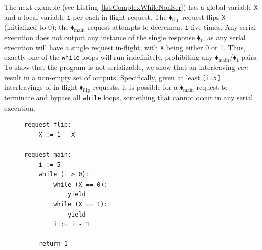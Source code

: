 The next example (see Listing~\ref{lst:ComplexWhileNonSer}) has a global variable \texttt{X} and a local variable \texttt{i} per each in-flight request. The {\color{ForestGreen}$\blacklozenge_\text{flip}$} request flips \texttt{X} (initialized to 0); the {\color{ForestGreen}$\blacklozenge_\text{main}$} request attempts to decrement \texttt{i} five times.
%
%
Any serial execution does not output any instance of the single response {\color{red}$\blacklozenge_1$}, 
as any serial execution will have a single request in-flight, with \texttt{X} being either 0 or 1. Thus, exactly one of the \texttt{while} loops will run indefinitely, prohibiting any {\color{ForestGreen}$\blacklozenge_\text{main}$}/{\color{red}$\blacklozenge_1$} pairs.
%
%
To show that the program is not serializable, we show that an interleaving \emph{can} result in a non-empty set of outputs. 
%
%
Specifically, given at least \texttt{[i=5]} interleavings of in-flight {\color{ForestGreen}$\blacklozenge_\text{flip}$} requests, it is possible for a {\color{ForestGreen}$\blacklozenge_\text{main}$} request to terminate and bypass all \texttt{while} loops, something that cannot occur in any serial execution.
%

\vspace{1em}  
\begin{figure}
	  \vspace{-1em}  %
	\centering
	\begin{lstlisting}[caption={Not serializable},label={lst:ComplexWhileNonSer},numbers=none]
request flip: 
    X := 1 - X 

request main:
    i := 5
    while (i > 0):
        while (X == 0):
            yield
        while (X == 1):
            yield
        i := i - 1

    return 1        
	\end{lstlisting}
\vspace{-0.5em}  %
\end{figure}
\vspace{1em}  %

